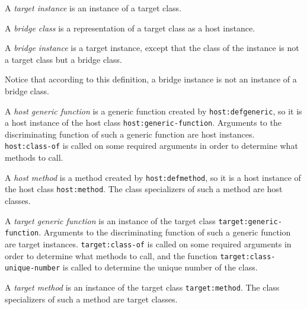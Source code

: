 \begin{definition}
A \emph{target instance} is an instance of a target class.
\end{definition}

\begin{definition}
A \emph{bridge class} is a representation of a target class as a host
instance.
\end{definition}

\begin{definition}
A \emph{bridge instance} is a target instance, except that the class of
the instance is not a target class but a bridge class.
\end{definition}

Notice that according to this definition, a bridge instance is not an
instance of a bridge class.

\begin{definition}
A \emph{host generic function} is a generic function created by
\texttt{host:defgeneric}, so it is a host instance of the host class
\texttt{host:generic-function}.  Arguments to the discriminating
function of such a generic function are host instances.
\texttt{host:class-of} is called on some required arguments in order
to determine what methods to call.
\end{definition}

\begin{definition}
A \emph{host method} is a method created by \texttt{host:defmethod},
so it is a host instance of the host class \texttt{host:method}.  The
class specializers of such a method are host classes.
\end{definition}

\begin{definition}
A \emph{target generic function} is an instance of the target class
\texttt{target:generic-function}.  Arguments to the discriminating
function of such a generic function are target instances.
\texttt{target:class-of} is called on some required arguments in order
to determine what methods to call, and the function
\texttt{target:class-unique-number} is called to determine the unique
number of the class.
\end{definition}

\begin{definition}
A \emph{target method} is an instance of the target class
\texttt{target:method}.  The class specializers of such a method are
target classes.
\end{definition}

